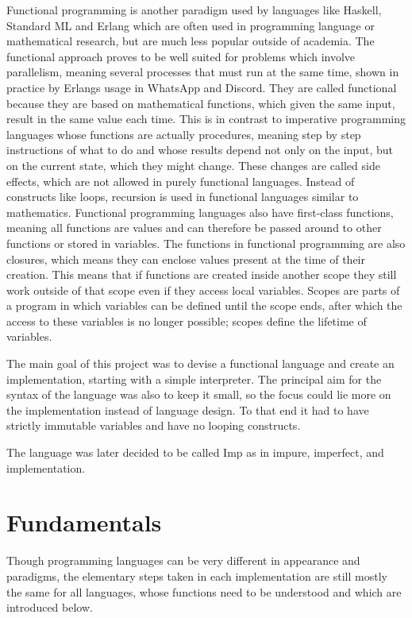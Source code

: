 \documentclass[12pt]{article}
\begin{document}
Functional programming is another paradigm used by languages like Haskell, Standard ML and Erlang
which are often used in programming language or mathematical research,
but are much less popular outside of academia.
The functional approach proves to be well suited for problems which involve parallelism,
meaning several processes that must run at the same time,
shown in practice by Erlangs usage in WhatsApp and Discord.
They are called functional because they are based on mathematical functions,
which given the same input, result in the same value each time.
This is in contrast to imperative programming languages whose functions are
actually procedures, meaning step by step instructions of what to do
and whose results depend not only on the input, but on the current state, which they
might change. These changes are called side effects, which are not allowed in purely
functional languages.
Instead of constructs like loops, recursion is used in functional languages similar to mathematics.
Functional programming languages also have first-class functions, meaning
all functions are values and can therefore be passed around to other functions
or stored in variables.
The functions in functional programming are also closures, which means they
can enclose values present at the time of their creation.
This means that if functions are created inside another scope
they still work outside of that scope even if they access local variables.
Scopes are parts of a program in which variables can be defined until
the scope ends, after which the access to these variables is no longer possible;
scopes define the lifetime of variables.



The main goal of this project was to devise a functional language
and create an implementation, starting with a simple interpreter.
The principal aim for the syntax of the language was also to keep it small,
so the focus could lie more on the implementation instead of language design.
To that end it had to have strictly immutable variables and have no looping constructs.

The language was later decided to be called Imp as in impure, imperfect, and implementation.

\newpage
\section{Fundamentals}
Though programming languages can be very different in appearance and paradigms,
the elementary steps taken in each implementation are
still mostly the same for all languages, whose functions need to be understood
and which are introduced below.
\end{document}
